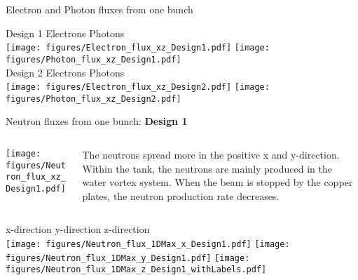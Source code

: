 \documentclass[xcolor={dvipsnames}]{beamer}
\begin{document}
\begin{frame}{Electron and Photon fluxes from one bunch}
\begin{center}
Design 1 \hspace*{1.4cm} Electrons \hfill Photons \hspace*{3.1cm} \\
 \texttt{[image: figures/Electron\_flux\_xz\_Design1.pdf]}
  \texttt{[image: figures/Photon\_flux\_xz\_Design1.pdf]}\\
Design 2 \hspace*{1.4cm} Electrons \hfill Photons \hspace*{3.1cm} \\ 
\texttt{[image: figures/Electron\_flux\_xz\_Design2.pdf]}
  \texttt{[image: figures/Photon\_flux\_xz\_Design2.pdf]}
\end{center}
\end{frame}
\begin{frame}{Neutron fluxes from one bunch: \textbf{Design 1}}
\begin{columns}
 \begin{column}{0.5\textwidth}
    \texttt{[image: figures/Neutron\_flux\_xz\_Design1.pdf]}
 \end{column}
 \begin{column}{0.5\textwidth}
  The neutrons spread more in the positive x and y-direction. Within the tank, the neutrons are mainly produced in the water vortex system. When the beam is stopped by the copper plates, the neutron production rate decreases.
 \end{column}
\end{columns}
\hspace*{1cm} x-direction \hfill y-direction \hfill z-direction \hspace*{1cm} \\
  \texttt{[image: figures/Neutron\_flux\_1DMax\_x\_Design1.pdf]}\hfill
  \texttt{[image: figures/Neutron\_flux\_1DMax\_y\_Design1.pdf]}\hfill
  \texttt{[image: figures/Neutron\_flux\_1DMax\_z\_Design1\_withLabels.pdf]}
\end{frame}
\end{document}
